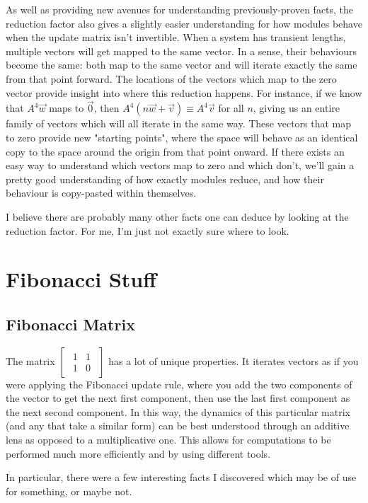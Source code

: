 \documentclass[a4paper, 12pt, reqno]{amsart}
\newcommand{\ssection}[1]{\vspace{1cm}\section{#1}}
\newcommand{\ssubsection}[1]{\vspace{0.25cm}\subsection{#1}}
\begin{document}
		As well as providing new avenues for understanding previously-proven facts, the reduction factor also gives
		a slightly easier understanding for how modules behave when the update matrix isn't invertible. When a system 
		has transient lengths, multiple vectors will get mapped to the same vector. In a sense, their behaviours become 
		the same: both map to the same vector and will iterate exactly the same from that point forward. The locations 
		of the vectors which map to the zero vector provide insight into where this reduction happens. For instance, 
		if we know that $A^{4}\vec{w}$ maps to $\vec{0}$, then $A^{4}(n\vec{w} + \vec{v}) \equiv A^{4}\vec{v}$ for all 
		$n$, giving us an entire family of vectors which will all iterate in the same way. These vectors that map to zero 
		provide new "starting points", where the space will behave as an identical copy to the space around the origin 
		from that point onward. If there exists an easy way to understand which vectors map to zero and which don't, 
		we'll gain a pretty good understanding of how exactly modules reduce, and how their behaviour is copy-pasted 
		within themselves.
		
		I believe there are probably many other facts one can deduce by looking at the reduction factor. For me,
		I'm just not exactly sure where to look.
	
	\ssection{Fibonacci Stuff}
		\ssubsection{Fibonacci Matrix}
			The matrix
			$
				\begin{bmatrix}
					\begin{smallmatrix}
						1 & 1 \\
						1 & 0
					\end{smallmatrix}
				\end{bmatrix}
			$
			has a lot of unique properties. It iterates vectors as if you were applying the Fibonacci update rule, where
			you add the two components of the vector to get the next first component, then use the last first component
			as the next second component. In this way, the dynamics of this particular matrix (and any that take a similar
			form) can be best understood through an additive lens as opposed to a multiplicative one. This allows for
			computations to be performed much more efficiently and by using different tools.
			
			In particular, there were a few interesting facts I discovered which may be of use for something, or maybe
			not. 
			
\end{document}
